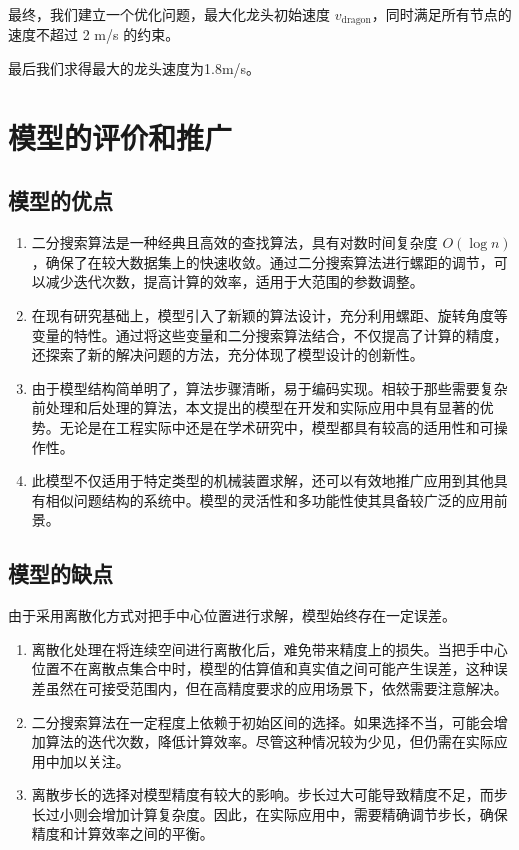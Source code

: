 \documentclass[withoutpreface, bwprint]{cumcmthesis} %
\begin{document}
最终，我们建立一个优化问题，最大化龙头初始速度 $v_{\text{dragon}}$，同时满足所有节点的速度不超过 2 m/s 的约束。

最后我们求得最大的龙头速度为1.8m/s。

\section{模型的评价和推广}

\subsection{模型的优点}

\begin{enumerate}
    \item 二分搜索算法是一种经典且高效的查找算法，具有对数时间复杂度 $O(\log n)$，确保了在较大数据集上的快速收敛。通过二分搜索算法进行螺距的调节，可以减少迭代次数，提高计算的效率，适用于大范围的参数调整。
    \item 在现有研究基础上，模型引入了新颖的算法设计，充分利用螺距、旋转角度等变量的特性。通过将这些变量和二分搜索算法结合，不仅提高了计算的精度，还探索了新的解决问题的方法，充分体现了模型设计的创新性。
    \item 由于模型结构简单明了，算法步骤清晰，易于编码实现。相较于那些需要复杂前处理和后处理的算法，本文提出的模型在开发和实际应用中具有显著的优势。无论是在工程实际中还是在学术研究中，模型都具有较高的适用性和可操作性。
    \item 此模型不仅适用于特定类型的机械装置求解，还可以有效地推广应用到其他具有相似问题结构的系统中。模型的灵活性和多功能性使其具备较广泛的应用前景。

\end{enumerate}

\subsection{模型的缺点}

由于采用离散化方式对把手中心位置进行求解，模型始终存在一定误差。

\begin{enumerate}
    \item 离散化处理在将连续空间进行离散化后，难免带来精度上的损失。当把手中心位置不在离散点集合中时，模型的估算值和真实值之间可能产生误差，这种误差虽然在可接受范围内，但在高精度要求的应用场景下，依然需要注意解决。

    \item 二分搜索算法在一定程度上依赖于初始区间的选择。如果选择不当，可能会增加算法的迭代次数，降低计算效率。尽管这种情况较为少见，但仍需在实际应用中加以关注。

    \item 离散步长的选择对模型精度有较大的影响。步长过大可能导致精度不足，而步长过小则会增加计算复杂度。因此，在实际应用中，需要精确调节步长，确保精度和计算效率之间的平衡。
\end{enumerate}
\end{document}
